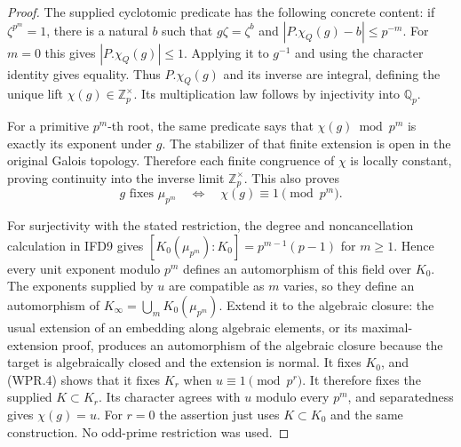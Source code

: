 \begin{proof}
The supplied cyclotomic predicate has the following concrete
content: if $\zeta^{p^m}=1$, there is a natural $b$ such that
$g\zeta=\zeta^b$ and $|P.\chi_Q(g)-b|\leq p^{-m}$.
For $m=0$ this gives $|P.\chi_Q(g)|\leq1$. Applying it to
$g^{-1}$ and using the character identity gives equality.
Thus $P.\chi_Q(g)$ and its inverse are integral, defining the
unique lift $\chi(g)\in\mathbb Z_p^\times$. Its multiplication
law follows by injectivity into $\mathbb Q_p$.

For a primitive $p^m$-th root, the same predicate says that
$\chi(g)\bmod p^m$ is exactly its exponent under $g$. The
stabilizer of that finite extension is open in the original
Galois topology. Therefore each finite congruence of $\chi$ is
locally constant, proving continuity into the inverse limit
$\mathbb Z_p^\times$. This also proves
\[
 g\text{ fixes }\mu_{p^m}
 \quad\Longleftrightarrow\quad \chi(g)\equiv1\pmod{p^m}.
 \tag{WPR.4}
\]

For surjectivity with the stated restriction, the degree and
noncancellation calculation in IFD9 gives
$[K_0(\mu_{p^m}):K_0]=p^{m-1}(p-1)$ for $m\geq1$.
Hence every unit exponent modulo $p^m$ defines an automorphism
of this field over $K_0$. The exponents supplied by $u$ are
compatible as $m$ varies, so they define an automorphism of
$K_\infty=\bigcup_mK_0(\mu_{p^m})$. Extend it to the algebraic
closure: the usual extension of an embedding along algebraic
elements, or its maximal-extension proof, produces an automorphism
of the algebraic closure because the target is algebraically closed
and the extension is normal. It fixes $K_0$, and (WPR.4) shows
that it fixes $K_r$ when $u\equiv1\pmod{p^r}$. It therefore fixes
the supplied $K\subset K_r$. Its character agrees with $u$
modulo every $p^m$, and separatedness gives $\chi(g)=u$.
For $r=0$ the assertion just uses $K\subset K_0$ and the same
construction. No odd-prime restriction was used.
\end{proof}

